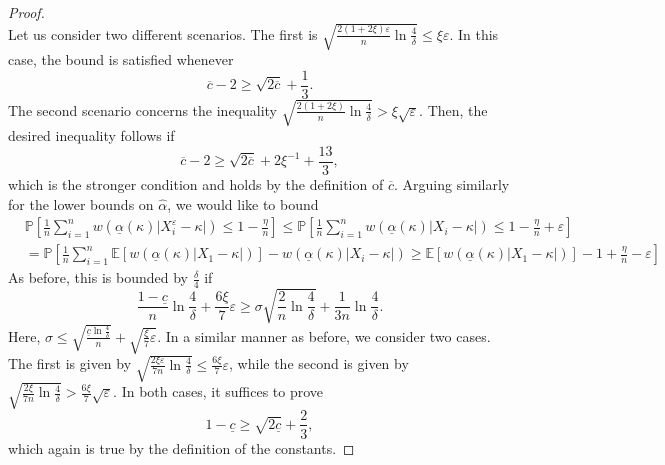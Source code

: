 \documentclass{article}
\theoremstyle{plain}
\theoremstyle{definition}
\def\eps{\varepsilon}
\renewcommand{\Pr}{\mathbb{P}}
\begin{document}
\begin{appendix}
{\begin{proof}
\[		\] 
		Let us consider two different scenarios. The first is \( \sqrt{\frac{2(1+2\xi )\eps}{n}\ln \frac{4}{\delta }}\le \xi \eps \). In this case, the bound is satisfied whenever \[
    \overline{c}-2\ge \sqrt{2\overline{c}} +\frac{1}{3}. 
		\]   
    The second scenario concerns the inequality \( \sqrt{\frac{2(1+2\xi )}{n}\ln \frac{4}{\delta }} > \xi \sqrt{\eps} \). Then, the desired inequality follows if \[
      \overline{c}-2\ge \sqrt{2\overline{c}}+2\xi^{-1}+\frac{13}{3}, 
    \] 
    which is the stronger condition and holds by the definition of \( \overline{c} \). Arguing similarly for the lower bounds on \( \widehat{\alpha }  \), we would like to bound \begin{align*}
      &\Pr\left[\frac{1}{n}\sum_{i=1}^{n} w(\underline{\alpha}(\kappa)\lvert X_i^\eps  - \kappa \rvert)\le 1-\frac{\eta}{n}\right] \le  \Pr\left[\frac{1}{n}\sum_{i=1}^{n} w(\underline{\alpha}(\kappa)\lvert X_i  - \kappa \rvert)\le 1-\frac{\eta}{n}+\eps \right]\\
&=\Pr\left[ \frac{1}{n}\sum_{i=1}^{n} \mathbb{E}\left[w (\underline{\alpha }(\kappa )\lvert X_1-\kappa  \rvert )\right]-w(\underline{\alpha}(\kappa)\lvert X_i  - \kappa \rvert)\ge \mathbb{E}\left[w (\underline{\alpha }(\kappa )\lvert X_1-\kappa  \rvert )\right]-1+\frac{\eta}{n}-\eps \right]
		\end{align*}
    As before, this is bounded by \( \frac{\delta}{4} \) if \[
      \frac{1 -\underline{c}}{n}\ln \frac{4}{\delta}+\frac{6\xi}{7}\varepsilon  \ge \sigma\sqrt{\frac{2}{n}\ln \frac{4}{\delta}}+\frac{1}{3n}\ln \frac{4}{\delta}.
    \] 
    Here, \( \sigma \le \sqrt{\frac{\underline{c}\ln \frac{4}{\delta }}{n}}+\sqrt{\frac{\xi}{7}\varepsilon }   \). In a similar manner as before, we consider two cases. The first is given by \( \sqrt{\frac{2\xi \varepsilon }{7n}\ln \frac{4}{\delta }}\le  \frac{6\xi}{7}\varepsilon   \), while the second is given by \( \sqrt{\frac{2\xi }{7n}\ln \frac{4}{\delta }}>\frac{6\xi }{7}\sqrt{\varepsilon } \). In both cases, it suffices to prove \[ 
			1-\underline{c}\ge  \sqrt{2\underline{c}} + \frac{2}{3},
		\]
		which again is true by the definition of the constants.
	\end{proof}}


\end{appendix}
\end{document}
